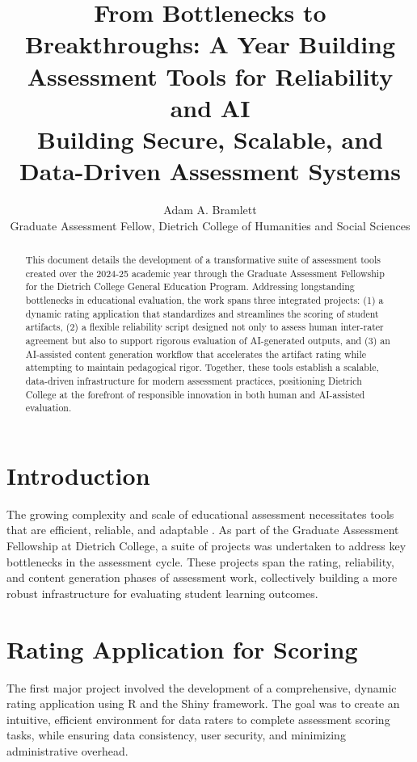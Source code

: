 \documentclass[12pt]{article}%
\title{From Bottlenecks to Breakthroughs: A Year Building Assessment Tools for Reliability and AI\\
\large Building Secure, Scalable, and Data-Driven Assessment Systems}
\author{Adam A. Bramlett\\
Graduate Assessment Fellow, Dietrich College of Humanities and Social Sciences }
\begin{document}
\doublespacing
\maketitle

\begin{abstract}
This document details the development of a transformative suite of assessment tools created over the 2024-25 academic year through the Graduate Assessment Fellowship for the Dietrich College General Education Program. Addressing longstanding bottlenecks in educational evaluation, the work spans three integrated projects: (1) a dynamic rating application that standardizes and streamlines the scoring of student artifacts, (2) a flexible reliability script designed not only to assess human inter-rater agreement but also to support rigorous evaluation of AI-generated outputs, and (3) an AI-assisted content generation workflow that accelerates the artifact rating while attempting to maintain pedagogical rigor. Together, these tools establish a scalable, data-driven infrastructure for modern assessment practices, positioning Dietrich College at the forefront of responsible innovation in both human and AI-assisted evaluation.
\end{abstract}

\section{Introduction}

The growing complexity and scale of educational assessment necessitates tools that are efficient, reliable, and adaptable \cite{pellegrino2001k, holmes2021AI}. As part of the Graduate Assessment Fellowship at Dietrich College, a suite of projects was undertaken to address key bottlenecks in the assessment cycle. These projects span the rating, reliability, and content generation phases of assessment work, collectively building a more robust infrastructure for evaluating student learning outcomes.

\section{Rating Application for Scoring}

The first major project involved the development of a comprehensive, dynamic rating application using R and the Shiny framework. The goal was to create an intuitive, efficient environment for data raters to complete assessment scoring tasks, while ensuring data consistency, user security, and minimizing administrative overhead.
\end{document}
